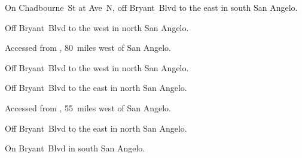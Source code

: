 

\begin{LocationList}

On  Chadbourne~St at Ave~N, off   Bryant~Blvd to the east in south San Angelo.

Off  Bryant~Blvd to the west in north San Angelo.

Accessed from , 80~miles west of San Angelo.

Off  Bryant~Blvd to the west in north San Angelo.

Off  Bryant~Blvd to the east in north San Angelo.

Accessed from , 55~miles west of San Angelo.

Off  Bryant~Blvd to the east in north San Angelo.

\Location{\TruckStop \Gas \Rest}
On   Bryant~Blvd in south San Angelo.

\end{LocationList}
